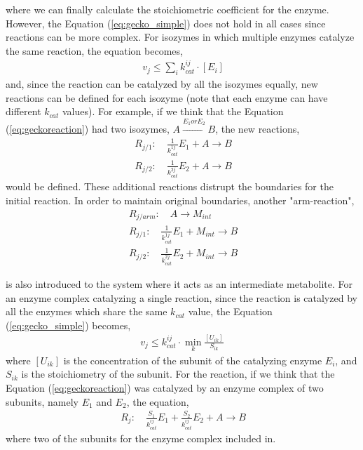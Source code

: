 where we can finally calculate the stoichiometric coefficient for the enzyme. However, the Equation (\ref{eq:gecko_simple}) does not hold in all cases since reactions can be more complex. For isozymes in which multiple enzymes catalyze the same reaction, the equation becomes,
\begin{align}
 \label{eq:gecko_isozymes}
 \ v_{j} \leq \sum\limits_{i} k_{cat}^{ij} \cdot [E_{i}]
\end{align}
and, since the reaction can be catalyzed by all the isozymes equally, new reactions can be defined for each isozyme (note that each enzyme can have different $k_{cat}$ values). For example, if we think that the Equation (\ref{eq:geckoreaction}) had two isozymes, $A \xrightarrow{E_1 or E_2} B$, the new reactions,
\begin{align}
 \ R_{j/1}: \quad \frac{1}{k_{cat}^{1j}}E_1 + A \to B \\
 \ R_{j/2}: \quad \frac{1}{k_{cat}^{2j}}E_2 + A \to B
\end{align}
would be defined. These additional reactions distrupt the boundaries for the initial reaction. In order to maintain original boundaries, another "arm-reaction",
\begin{align}
 \ R_{j/arm}: \quad A \to M_{int} \\
 \ R_{j/1}: \quad \frac{1}{k_{cat}^{1j}}E_1 + M_{int} \to B \\
 \ R_{j/2}: \quad \frac{1}{k_{cat}^{2j}}E_2 + M_{int} \to B
\end{align}

\vspace{0.5cm}

\noindent is also introduced to the system where it acts as an intermediate metabolite. For an enzyme complex catalyzing a single reaction, since the reaction is catalyzed by all the enzymes which share the same $k_{cat}$ value, the Equation (\ref{eq:gecko_simple}) becomes,
\begin{align}
 \label{eq:gecko_complex}
 \ v_{j} \leq  k_{cat}^{ij} \cdot \min\limits_{k} \frac{ [U_{ik}] }{ S_{ik} }
 \
\end{align}
\noindent where $[U_{ik}]$  is the concentration of the subunit of the catalyzing enzyme $E_{i}$, and $S_{ik}$ is the stoichiometry of the subunit. For the reaction, if we think that the Equation (\ref{eq:geckoreaction}) was catalyzed by an enzyme complex of two subunits, namely ${E_1}$ and ${E_2}$, the equation,
\begin{align}
 \label{eq:gecko_complex2}
 \ R_{j}: \quad \frac{S_1}{k_{cat}^{ij}}E_1 +\frac{S_2}{k_{cat}^{ij}}E_2 + A \to B
\end{align}
where two of the subunits for the enzyme complex included in.

